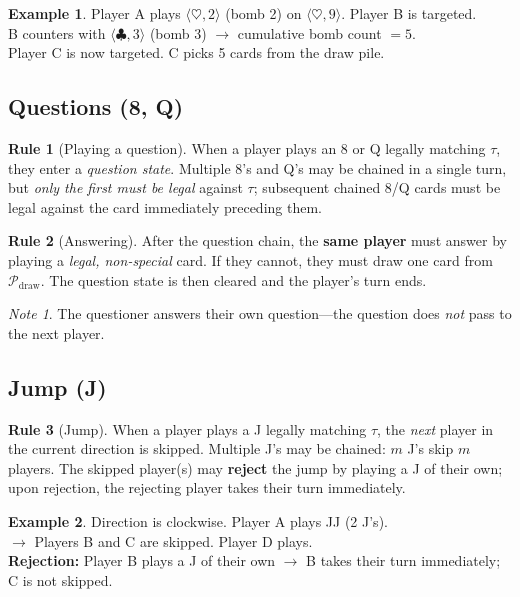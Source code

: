 \documentclass[11pt,a4paper,twoside]{article}
\theoremstyle{definition}
\newtheorem{rule}{Rule}[section]
\newtheorem{example}{Example}[section]
\theoremstyle{remark}
\newtheorem{note}{Note}[section]
\newcommand{\Card}[2]{\ensuremath{\langle #1, #2 \rangle}}
\newcommand{\Pile}{\ensuremath{\mathcal{P}}}
\newcommand{\Top}{\ensuremath{\tau}}
\begin{document}
\begin{example}
  Player A plays $\Card{\heartsuit}{2}$ (bomb 2) on $\Card{\heartsuit}{9}$.
  Player B is targeted.\\
  B counters with $\Card{\clubsuit}{3}$ (bomb 3) $\to$ cumulative bomb count $= 5$.\\
  Player C is now targeted. C picks 5 cards from the draw pile.
\end{example}

\subsection{Questions (8, Q)}
\label{sec:question}

\begin{rule}[Playing a question]
  When a player plays an 8 or Q legally matching $\Top$, they enter a
  \emph{question state}. Multiple 8's and Q's may be chained in a single
  turn, but \emph{only the first must be legal} against $\Top$; subsequent
  chained 8/Q cards must be legal against the card immediately preceding
  them.
\end{rule}

\begin{rule}[Answering]
  After the question chain, the \textbf{same player} must answer by playing
  a \emph{legal, non-special} card. If they cannot, they must draw one card
  from $\Pile_{\text{draw}}$. The question state is then cleared and the
  player's turn ends.
\end{rule}

\begin{note}
  The questioner answers their own question---the question does \emph{not}
  pass to the next player.
\end{note}

\subsection{Jump (J)}
\label{sec:jump}

\begin{rule}[Jump]
  When a player plays a J legally matching $\Top$, the \emph{next} player in
  the current direction is skipped. Multiple J's may be chained: $m$ J's skip
  $m$ players. The skipped player(s) may \textbf{reject} the jump by playing
  a J of their own; upon rejection, the rejecting player takes their turn
  immediately.
\end{rule}

\begin{example}
  Direction is clockwise. Player A plays JJ (2 J's).\\
  $\to$ Players B and C are skipped. Player D plays.\\
  \textbf{Rejection:} Player B plays a J of their own $\to$ B takes their
  turn immediately; C is not skipped.
\end{example}
\end{document}
